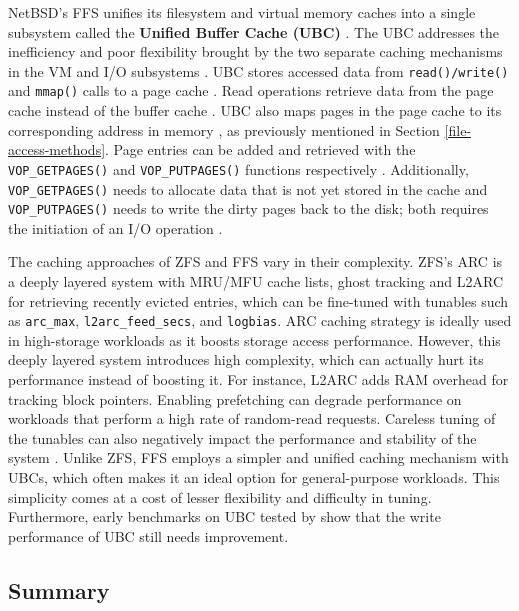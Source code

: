 NetBSD's FFS unifies its filesystem and virtual memory caches into a single subsystem called the \textbf{Unified Buffer Cache (UBC)}
\parencite{silvers2000}. The UBC addresses the inefficiency and poor flexibility brought by the two separate caching mechanisms in
the VM and I/O subsystems \parencite{silvers2000}. UBC stores accessed data from \texttt{read()/write()} and \texttt{mmap()} calls
to a page cache \parencite{silvers2000}. Read operations retrieve data from the page cache instead of the buffer cache \parencite{silvers2000}.
UBC also maps pages in the page cache to its corresponding address in memory \parencite{silvers2000}, as previously mentioned in
Section \ref{file-access-methods}. Page entries can be added and retrieved with the \texttt{VOP\_GETPAGES()} and \texttt{VOP\_PUTPAGES()}
functions respectively \parencite{silvers2000}. Additionally, \texttt{VOP\_GETPAGES()} needs to allocate data that is not yet stored
in the cache and \texttt{VOP\_PUTPAGES()} needs to write the dirty pages back to the disk; both requires the initiation of an I/O
operation \parencite{silvers2000}.

The caching approaches of ZFS and FFS vary in their complexity. ZFS's ARC is a deeply layered system with MRU/MFU cache lists, ghost
tracking and L2ARC for retrieving recently evicted entries, which can be fine-tuned with tunables such as \texttt{arc\_max},
\texttt{l2arc\_feed\_secs}, and \texttt{logbias}. ARC caching strategy is ideally used in high-storage workloads as it boosts
storage access performance. However, this deeply layered system introduces high complexity, which can actually hurt its performance
instead of boosting it. For instance, L2ARC adds RAM overhead for tracking block pointers. Enabling
prefetching can degrade performance on workloads that perform a high rate of random-read requests. Careless tuning of the tunables
can also negatively impact the performance and stability of the system \parencite{khurshid2025}. Unlike ZFS, FFS employs a
simpler and unified caching mechanism with UBCs, which often makes it an ideal option for general-purpose workloads.
This simplicity comes at a cost of lesser flexibility and difficulty in tuning. Furthermore, early benchmarks on UBC tested by
\textcite{silvers2000} show that the write performance of UBC still needs improvement.

\subsection{Summary} \label{file-and-disk-summary}

